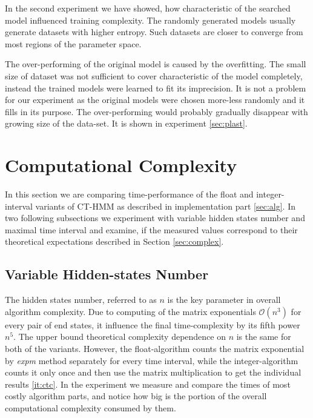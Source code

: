 \documentclass[thesis=M,english]{FITthesis}[2012/10/20]
\begin{document}
In the second experiment we have showed, how characteristic of the searched model influenced training complexity. The randomly generated models usually generate datasets with higher entropy. Such datasets are closer to converge from most regions of the parameter space. 

The over-performing of the original model is caused by the overfitting. The small size of dataset was not sufficient to cover characteristic of the model completely, instead the trained models were learned to fit its imprecision. It is not a problem for our experiment as the original models were chosen more-less randomly and it fills in its purpose. The over-performing would probably gradually disappear with growing size of the data-set. It is shown in experiment \ref{sec:plast}.



\section{Computational Complexity}\label{sec:cc}

In this section we are comparing time-performance of the float and integer-interval variants of CT-HMM  as described in implementation part \ref{sec:alg}.
In two following subsections we experiment with variable hidden states number and maximal time interval and examine, if the measured values correspond to their theoretical expectations described in Section \ref{sec:complex}.

\subsection{Variable Hidden-states Number}

The hidden states number, referred to as $n$ is the key parameter in overall algorithm complexity. Due to computing of the matrix exponentials $\mathcal{O}(n^3)$ for every pair of end states, it influence the final time-complexity by its fifth power $n^5$. The upper bound theoretical complexity dependence on $n$ is the same for both of the variants. However, the float-algorithm counts the matrix exponential by \textit{expm} method separately for every time interval, while the integer-algorithm counts it only once and then use the matrix multiplication to get the individual results \ref{it:ctc}. In the experiment we measure and compare the times of most costly algorithm parts, and notice how big is the portion of the overall computational complexity consumed by them. 
\end{document}
